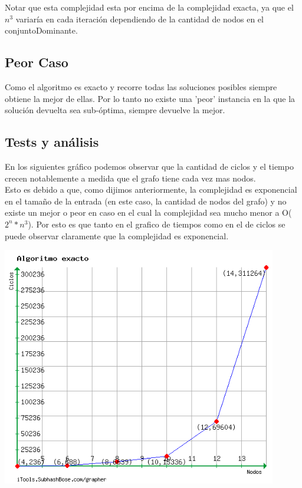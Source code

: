 Notar que esta complejidad esta por encima de la complejidad exacta, ya que el $n^3$ variaría en cada iteración dependiendo de la cantidad de nodos en el conjuntoDominante.

\subsection{Peor Caso}

Como el algoritmo es exacto y recorre todas las soluciones posibles siempre obtiene la mejor de ellas. Por lo tanto no existe una 'peor' instancia
en la que la solución devuelta sea sub-óptima, siempre devuelve la mejor.

\subsection{Tests y análisis}
En los siguientes gráfico podemos observar que la cantidad de ciclos y el tiempo crecen notablemente a medida que el grafo tiene cada vez mas nodos.\\
Esto es debido a que, como dijimos anteriormente, la complejidad es exponencial en el tamaño de la entrada (en este caso, la cantidad de nodos 
del grafo) y no existe un mejor o peor en caso en el cual la complejidad sea mucho menor a O($2^n*n^3$). Por esto es que tanto en el grafico de tiempos
 como en el de ciclos se puede observar claramente que la complejidad es exponencial.

\begin {center}
\includegraphics[width=12cm]{./graficos/exacto.png}
\end {center} 

